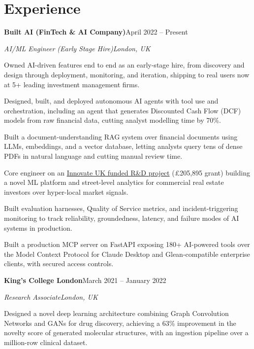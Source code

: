 \documentclass[10pt,a4paper]{article}
\newcommand{\entry}[4]{%
  {\color{company}\bfseries #1}\hfill {\color{muted}#2}\par
  \vspace{1pt}
  {\itshape #3}\hfill {\color{muted}\itshape #4}\par
  \vspace{3pt}%
}
\begin{document}
\section{Experience}
\entry{Built AI (FinTech \& AI Company)}{April 2022 -- Present}{AI/ML Engineer (Early Stage Hire)}{London, UK}
\begin{tight}
  \item Owned AI-driven features end to end as an early-stage hire, from discovery and design through deployment, monitoring, and iteration, shipping to real users now at 5+ leading investment management firms.
  \item Designed, built, and deployed autonomous AI agents with tool use and orchestration, including an agent that generates Discounted Cash Flow (DCF) models from raw financial data, cutting analyst modelling time by 70\%.
  \item Built a document-understanding RAG system over financial documents using LLMs, embeddings, and a vector database, letting analysts query tens of dense PDFs in natural language and cutting manual review time.
  \item Core engineer on an \href{https://gtr.ukri.org/projects?ref=10022996}{Innovate UK funded R\&D project} (\pounds205,895 grant) building a novel ML platform and street-level analytics for commercial real estate investors over hyper-local market signals.
  \item Built evaluation harnesses, Quality of Service metrics, and incident-triggering monitoring to track reliability, groundedness, latency, and failure modes of AI systems in production.
  \item Built a production MCP server on FastAPI exposing 180+ AI-powered tools over the Model Context Protocol for Claude Desktop and Glean-compatible enterprise clients, with secured access controls.
\end{tight}

\entry{King's College London}{March 2021 -- January 2022}{Research Associate}{London, UK}
\begin{tight}
  \item Designed a novel deep learning architecture combining Graph Convolution Networks and GANs for drug discovery, achieving a 63\% improvement in the novelty score of generated molecular structures, with an ingestion pipeline over a million-row clinical dataset.
\end{tight}

\end{document}
